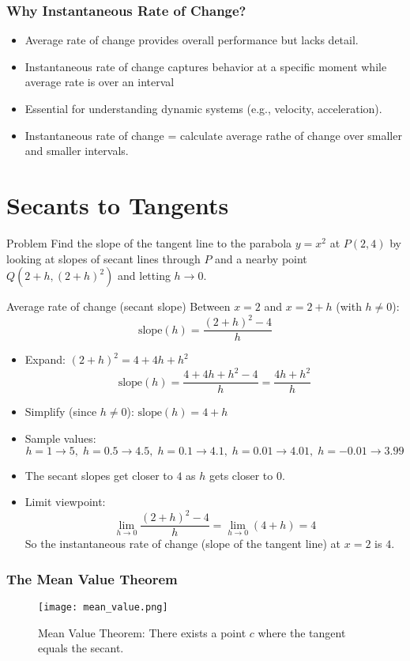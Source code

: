 \frametitle{Why Instantaneous Rate of Change?}
\begin{itemize}
  \item Average rate of change provides overall performance but lacks detail.
  \item Instantaneous rate of change captures behavior at a specific moment while average rate is over an interval
  \item Essential for understanding dynamic systems (e.g., velocity, acceleration).
  \item Instantaneous rate of change = calculate average rathe of change over smaller and smaller intervals.
\end{itemize}
\section{Secants to Tangents}
  \begin{block}{Problem}
    Find the slope of the tangent line to the parabola $y = x^{2}$ at $P(2,4)$ by looking at slopes of secant lines through $P$ and a nearby point $Q(2+h,(2+h)^{2})$ and letting $h \to 0$.
  \end{block}

  \begin{block}{Average rate of change (secant slope)}
    Between $x=2$ and $x=2+h$ (with $h \ne 0$):
    \[
      \text{slope}(h)=\frac{(2+h)^2 - 4}{h}
    \]
  \end{block}

  \begin{itemize}
    \item Expand: $(2+h)^2 = 4 + 4h + h^{2}$
      \[
        \text{slope}(h)=\frac{4+4h+h^{2}-4}{h}= \frac{4h+h^{2}}{h}
      \]
    \item Simplify (since $h \ne 0$): $\text{slope}(h)=4 + h$
    \item Sample values:
      \[
        h=1\!\to\!5,\; h=0.5\!\to\!4.5,\; h=0.1\!\to\!4.1,\; h=0.01\!\to\!4.01,\; h=-0.01\!\to\!3.99
      \]
    \item The secant slopes get closer to $4$ as $h$ gets closer to $0$.
    \item Limit viewpoint:
      \[
        \lim_{h\to 0} \frac{(2+h)^2 - 4}{h} = \lim_{h\to 0} (4 + h)=4
      \]
      So the instantaneous rate of change (slope of the tangent line) at $x=2$ is $4$.
  \end{itemize}



  \frametitle{The Mean Value Theorem}
  \begin{figure}
    \texttt{[image: mean\_value.png]}
    \caption{Mean Value Theorem: There exists a point $c$ where the tangent equals the secant.}
  \end{figure}
